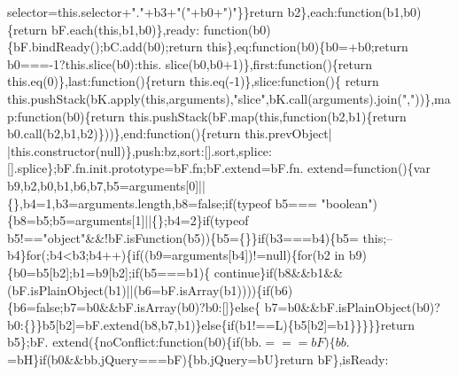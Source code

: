 \begin{DoxyCode}
      selector=this.selector+\textcolor{stringliteral}{"."}+b3+\textcolor{stringliteral}{"("}+b0+\textcolor{stringliteral}{")"}\}\}\textcolor{keywordflow}{return} b2\},each:\textcolor{keyword}{function}(b1,b0)\{\textcolor{keywordflow}{return} bF.each(\textcolor{keyword}{this},b1,b0)\},ready:\textcolor{keyword}{
      function}(b0)\{bF.bindReady();bC.add(b0);\textcolor{keywordflow}{return} \textcolor{keyword}{this}\},eq:\textcolor{keyword}{function}(b0)\{b0=+b0;\textcolor{keywordflow}{return} b0===-1?this.slice(b0):this.
      slice(b0,b0+1)\},first:function()\{\textcolor{keywordflow}{return} this.eq(0)\},last:\textcolor{keyword}{function}()\{\textcolor{keywordflow}{return} this.eq(-1)\},slice:\textcolor{keyword}{function}()\{\textcolor{keywordflow}{
      return} this.pushStack(bK.apply(\textcolor{keyword}{this},arguments),\textcolor{stringliteral}{"slice"},bK.call(arguments).join(\textcolor{stringliteral}{","}))\},map:\textcolor{keyword}{function}(b0)\{\textcolor{keywordflow}{return} 
      this.pushStack(bF.map(\textcolor{keyword}{this},\textcolor{keyword}{function}(b2,b1)\{\textcolor{keywordflow}{return} b0.call(b2,b1,b2)\}))\},end:\textcolor{keyword}{function}()\{\textcolor{keywordflow}{return} this.prevObject|
      |this.constructor(null)\},push:bz,sort:[].sort,splice:[].splice\};bF.fn.init.prototype=bF.fn;bF.extend=bF.fn.
      extend=\textcolor{keyword}{function}()\{var b9,b2,b0,b1,b6,b7,b5=arguments[0]||\{\},b4=1,b3=arguments.length,b8=\textcolor{keyword}{false};\textcolor{keywordflow}{if}(typeof b5===\textcolor{stringliteral}{
      "boolean"})\{b8=b5;b5=arguments[1]||\{\};b4=2\}\textcolor{keywordflow}{if}(typeof b5!==\textcolor{stringliteral}{"object"}&&!bF.isFunction(b5))\{b5=\{\}\}\textcolor{keywordflow}{if}(b3===b4)\{b5=\textcolor{keyword}{
      this};--b4\}\textcolor{keywordflow}{for}(;b4<b3;b4++)\{\textcolor{keywordflow}{if}((b9=arguments[b4])!=null)\{\textcolor{keywordflow}{for}(b2 in b9)\{b0=b5[b2];b1=b9[b2];\textcolor{keywordflow}{if}(b5===b1)\{\textcolor{keywordflow}{
      continue}\}\textcolor{keywordflow}{if}(b8&&b1&&(bF.isPlainObject(b1)||(b6=bF.isArray(b1))))\{\textcolor{keywordflow}{if}(b6)\{b6=\textcolor{keyword}{false};b7=b0&&bF.isArray(b0)?b0:[]\}\textcolor{keywordflow}{else}\{
      b7=b0&&bF.isPlainObject(b0)?b0:\{\}\}b5[b2]=bF.extend(b8,b7,b1)\}\textcolor{keywordflow}{else}\{\textcolor{keywordflow}{if}(b1!==L)\{b5[b2]=b1\}\}\}\}\}\textcolor{keywordflow}{return} b5\};bF.
      extend(\{noConflict:\textcolor{keyword}{function}(b0)\{\textcolor{keywordflow}{if}(bb.$===bF)\{bb.$=bH\}\textcolor{keywordflow}{if}(b0&&bb.jQuery===bF)\{bb.jQuery=bU\}\textcolor{keywordflow}{return} bF\},isReady:\textcolor{keyword}{
}
\end{DoxyCode}
